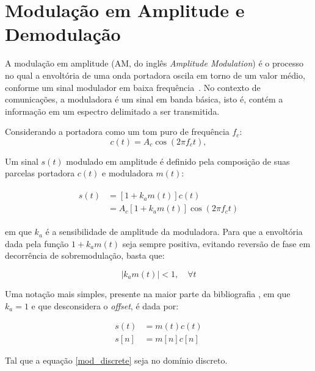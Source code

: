 \section{Modulação em Amplitude e Demodulação}
A modulação em amplitude (AM, do inglês \textit{Amplitude Modulation}) é o
processo no qual a envoltória de uma onda portadora oscila em torno de um valor
médio, conforme um sinal modulador em baixa frequência~\cite{haykin2008}. No
contexto de comunicações, a moduladora é um sinal em  banda básica, isto é,
contém a informação em um espectro delimitado a ser transmitida.

Considerando a portadora como um tom puro de frequência $f_c$:
\begin{equation}
    c(t) = A_c \cos(2\pi f_c t),
\end{equation}
    
    Um sinal $s(t)$ modulado em amplitude é definido pela composição de
suas parcelas portadora $c(t)$ e moduladora $m(t)$:

\begin{align}
\begin{split}
    s(t) & = [1+k_a m(t)]c(t) \\
    & = A_c[1+k_a m(t)]\cos(2\pi f_c t)
\end{split}
\end{align}

em que $k_a$ é a sensibilidade de amplitude da moduladora. Para que a envoltória
dada pela função $1+k_a m(t)$ seja sempre positiva, evitando reversão de fase
em decorrência de sobremodulação, basta que:

\begin{equation}
    |k_a m(t)| < 1, \quad \forall t
\end{equation}

Uma notação mais simples, presente na maior parte da 
bibliografia , em que $k_a = 1$ e que desconsidera o  \textit{offset}, é dada
por:

\begin{align}
    s(t) &= m(t)c(t) \\
    s[n] &= m[n]c[n] \label{mod_discrete}
\end{align}

Tal que a equação \ref{mod_discrete} seja no domínio discreto.

